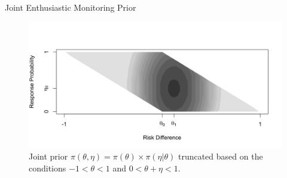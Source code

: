 \documentclass{beamer}
\begin{document}

\begin{frame}{Joint Enthusiastic Monitoring Prior}
\begin{figure}[htbp]
\begin{center}
\includegraphics[width=1\textwidth]{./figures/enth_aug12.png}
\caption{Joint prior $\pi(\theta,\eta)=\pi(\theta)\times\pi(\eta|\theta)$ truncated based on the conditions $-1<\theta<1$ and $0<\theta+\eta<1$.}
\label{fig:figure5}
 \end{center}
\end{figure}
\end{frame}



\end{document}
